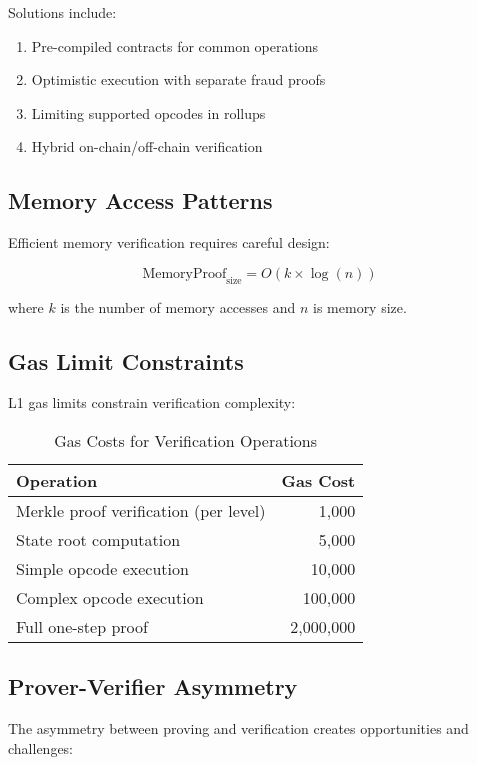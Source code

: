 \documentclass[11pt,a4paper]{article}
\theoremstyle{definition}
\begin{document}
Solutions include:
\begin{enumerate}
    \item Pre-compiled contracts for common operations
    \item Optimistic execution with separate fraud proofs
    \item Limiting supported opcodes in rollups
    \item Hybrid on-chain/off-chain verification
\end{enumerate}

\subsection{Memory Access Patterns}

Efficient memory verification requires careful design:

\begin{equation}
\text{MemoryProof}_{\text{size}} = O(k \times \log(n))
\end{equation}

where $k$ is the number of memory accesses and $n$ is memory size.

\subsection{Gas Limit Constraints}

L1 gas limits constrain verification complexity:

\begin{table}[h]
\centering
\caption{Gas Costs for Verification Operations}
\begin{tabular}{lr}
\toprule
\textbf{Operation} & \textbf{Gas Cost} \\
\midrule
Merkle proof verification (per level) & 1,000 \\
State root computation & 5,000 \\
Simple opcode execution & 10,000 \\
Complex opcode execution & 100,000 \\
Full one-step proof & 2,000,000 \\
\bottomrule
\end{tabular}
\end{table}

\subsection{Prover-Verifier Asymmetry}

The asymmetry between proving and verification creates opportunities and challenges:
\end{document}
